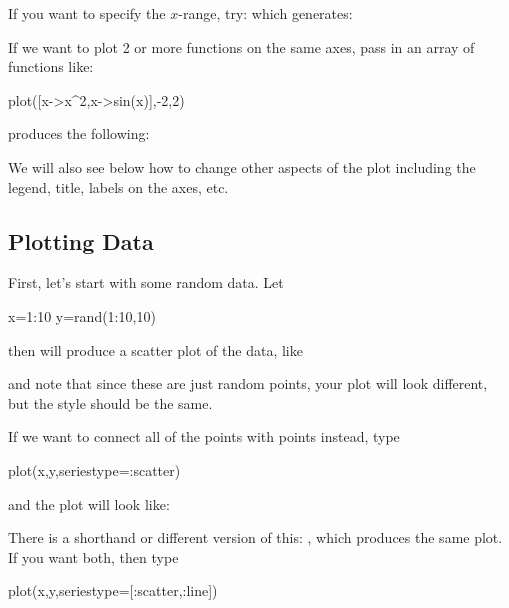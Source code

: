 If you want to specify the $x$-range, try:  which generates: 
\begin{center}
\pgfplotsset{scale=0.5}
\end{center}

If we want to plot 2 or more functions on the same axes, pass in an array of functions like: 
\begin{jlblock}[plots]
plot([x->x^2,x->sin(x)],-2,2)
\end{jlblock}
%
produces the following:
\begin{center}
\pgfplotsset{scale=0.5}
\end{center}

We will also see below how to change other aspects of the plot including the legend, title, labels on the axes, etc.  


\subsection{Plotting Data}

First, let's start with some random data. Let

\begin{jlblock}[plots]
x=1:10
y=rand(1:10,10)
\end{jlblock}
%
then  will produce a scatter plot of the data, like
%
\begin{center}
\pgfplotsset{scale=0.7}
\end{center}
%
and note that since these are just random points, your plot will look
different, but the style should be the same.

If we want to connect all of the points with points instead, type
%
\begin{jlblock}[plots]
plot(x,y,seriestype=:scatter)
\end{jlblock}
%
and the plot will look like:

\begin{center}
\pgfplotsset{scale=0.7}
\end{center}

There is a shorthand or different version of this: , which produces the same plot. 
If you want both, then type

\begin{jlblock}[plots]
plot(x,y,seriestype=[:scatter,:line])
\end{jlblock}
%
\begin{center}
\pgfplotsset{scale=0.7}
\end{center}



